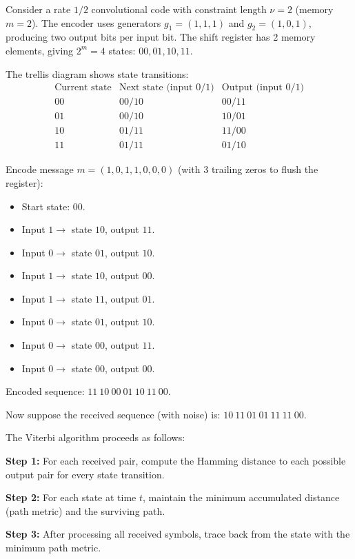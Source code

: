\begin{example}
Consider a rate $1/2$ convolutional code with constraint length $\nu = 2$ (memory $m = 2$). The encoder uses generators $g_1 = (1,1,1)$ and $g_2 = (1,0,1)$, producing two output bits per input bit. The shift register has 2 memory elements, giving $2^{m} = 4$ states: $00, 01, 10, 11$.

The trellis diagram shows state transitions:
\[
\begin{array}{c|c|c}
\text{Current state} & \text{Next state (input 0/1)} & \text{Output (input 0/1)} \\ \hline
00 & 00 / 10 & 00 / 11 \\
01 & 00 / 10 & 10 / 01 \\
10 & 01 / 11 & 11 / 00 \\
11 & 01 / 11 & 01 / 10
\end{array}
\]

Encode message $m = (1, 0, 1, 1, 0, 0, 0)$ (with 3 trailing zeros to flush the register):
\begin{itemize}
\item Start state: $00$.
\item Input $1 \to$ state $10$, output $11$.
\item Input $0 \to$ state $01$, output $10$.
\item Input $1 \to$ state $10$, output $00$.
\item Input $1 \to$ state $11$, output $01$.
\item Input $0 \to$ state $01$, output $10$.
\item Input $0 \to$ state $00$, output $11$.
\item Input $0 \to$ state $00$, output $00$.
\end{itemize}

Encoded sequence: $11\ 10\ 00\ 01\ 10\ 11\ 00$.

Now suppose the received sequence (with noise) is: $10\ 11\ 01\ 01\ 11\ 11\ 00$.

The Viterbi algorithm proceeds as follows:

\textbf{Step 1:} For each received pair, compute the Hamming distance to each possible output pair for every state transition.

\textbf{Step 2:} For each state at time $t$, maintain the minimum accumulated distance (path metric) and the surviving path.

\textbf{Step 3:} After processing all received symbols, trace back from the state with the minimum path metric.


\end{example}

